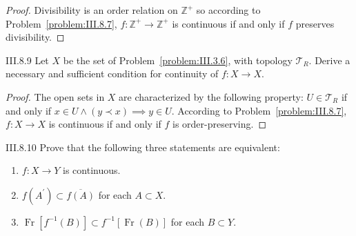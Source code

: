 \begin{proof}
    Divisibility is an order relation on \( \mathbb{Z}^{+} \) so according to Problem~\ref{problem:III.8.7}, \( f: \mathbb{Z}^{+} \to \mathbb{Z}^{+} \) is continuous if and only if \( f \) preserves divisibility.
\end{proof}

\begin{problem}{III.8.9}
Let \( X \) be the set of Problem~\ref{problem:III.3.6}, with topology \( \mathscr{T}_{R} \). Derive a necessary and sufficient condition for continuity of \( f: X \to X \).
\end{problem}

\begin{proof}
    The open sets in \( X \) are characterized by the following property: \( U \in \mathscr{T}_{R} \) if and only if \( x \in U \land (y \prec x) \implies y \in U \). According to Problem~\ref{problem:III.8.7}, \( f: X \to X \) is continuous if and only if \( f \) is order-preserving.
\end{proof}

\begin{problem}{III.8.10}
Prove that the following three statements are equivalent:
\begin{enumerate}[label={(\alph*)}]
    \item \( f: X \to Y \) is continuous.
    \item \( f(A^{\prime}) \subset \overline{f(A)} \) for each \( A \subset X \).
    \item \( \operatorname{Fr}\left\lbrack f^{-1}(B) \right\rbrack \subset f^{-1}\left\lbrack \operatorname{Fr}(B) \right\rbrack \) for each \( B \subset Y \).
\end{enumerate}
\end{problem}

